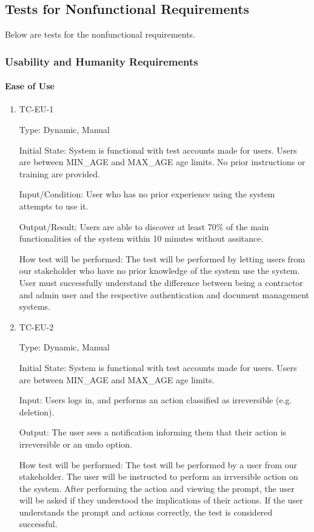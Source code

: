 \documentclass[12pt, titlepage]{article}
\begin{document}
\subsection{Tests for Nonfunctional Requirements}

Below are tests for the nonfunctional requirements.

\subsubsection{Usability and Humanity Requirements}

\paragraph{Ease of Use}

\begin{enumerate}

  \item{TC-EU-1\\}

    Type: Dynamic, Manual

    Initial State: System is functional with test accounts made for users. Users
    are between MIN\_AGE and MAX\_AGE age limits. No prior instructions or
    training are provided.

    Input/Condition: User who has no prior experience using the system attempts
    to use it.

    Output/Result: Users are able to discover at least 70\% of the main
    functionalities of the system within 10 minutes without assitance.

    How test will be performed: The test will be performed by letting users from
    our stakeholder who have no prior knowledge of the system use the system.
    User must successfully understand the difference between being a contractor and admin user 
    and the respective authentication and document management systems.\\

  \item{TC-EU-2\\}

    Type: Dynamic, Manual

    Initial State: System is functional with test accounts made for users. Users
    are between MIN\_AGE and MAX\_AGE age limits.

    Input: Users logs in, and performs an action classified as irreversible
    (e.g. deletion).

    Output: The user sees a notification informing them that their action is
    irreversible or an undo option.

    How test will be performed: The test will be performed by a user from our
    stakeholder. The user will be instructed to perform an irrversible action on
    the system. After performing the action and viewing the prompt, the user
    will be asked if they understood the implications of their actions. If the
    user understands the prompt and actions correctly, the test is considered
    successful.

\end{enumerate}
\end{document}
